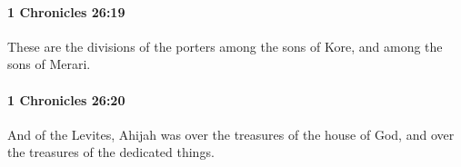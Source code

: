 		\paragraph{1 Chronicles 26:19} %
			\label{1CHRONICLES-26-19}

			These are the divisions of the porters among the sons of Kore, and among the sons of Merari.


		\paragraph{1 Chronicles 26:20} %
			\label{1CHRONICLES-26-20}

			And of the Levites, Ahijah was over the treasures of the house of God, and over the treasures of the dedicated things.


